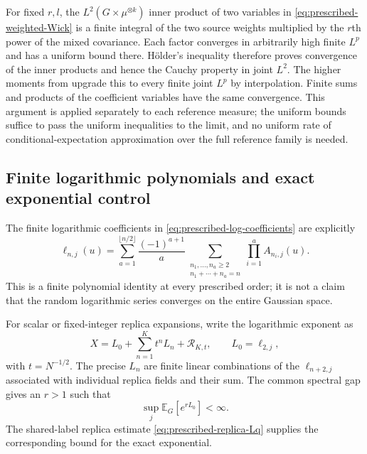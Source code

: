 \documentclass[11pt,reqno]{amsart}
\numberwithin{equation}{section}
\theoremstyle{plain}
\theoremstyle{definition}
\newcommand{\E}{\mathbb E}
\begin{document}
For fixed $r,l$, the $L^2(G\times\mu^{\otimes k})$ inner product of two variables in \eqref{eq:prescribed-weighted-Wick} is a finite integral of the two source weights multiplied by the $r$th power of the mixed covariance.  Each factor converges in arbitrarily high finite $L^p$ and has a uniform bound there.  H\"older's inequality therefore proves convergence of the inner products and hence the Cauchy property in joint $L^2$.  The higher moments from  upgrade this to every finite joint $L^p$ by interpolation.  Finite sums and products of the coefficient variables have the same convergence.  This argument is applied separately to each reference measure; the uniform bounds suffice to pass the uniform inequalities to the limit, and no uniform rate of conditional-expectation approximation over the full reference family is needed.

\subsection{Finite logarithmic polynomials and exact exponential control}

The finite logarithmic coefficients in \eqref{eq:prescribed-log-coefficients} are explicitly
\begin{equation}
 \ell_{n,j}(u)
 =\sum_{a=1}^{\lfloor n/2\rfloor}\frac{(-1)^{a+1}}a
 \sum_{\substack{n_1,\ldots,n_a\geq2\\n_1+\cdots+n_a=n}}
 \prod_{i=1}^aA_{n_i,j}(u).
 \label{eq:prescribed-ell-recursion}
\end{equation}
This is a finite polynomial identity at every prescribed order; it is not a claim that the random logarithmic series converges on the entire Gaussian space.

For scalar or fixed-integer replica expansions, write the logarithmic exponent as
\begin{equation}
 X=L_0+\sum_{n=1}^{K}t^nL_n+\mathcal R_{K,t},
 \qquad
 L_0=\ell_{2,j},
 \label{eq:prescribed-generic-log-exponent}
\end{equation}
with $t=N^{-1/2}$.  The precise $L_n$ are finite linear combinations of the $\ell_{n+2,j}$ associated with individual replica fields and their sum.  The common spectral gap gives an $r>1$ such that
\begin{equation}
 \sup_j\E_G[e^{rL_0}]<\infty.
 \label{eq:prescribed-quadratic-buffer}
\end{equation}
The shared-label replica estimate \eqref{eq:prescribed-replica-Lq} supplies the corresponding bound for the exact exponential.
\end{document}

